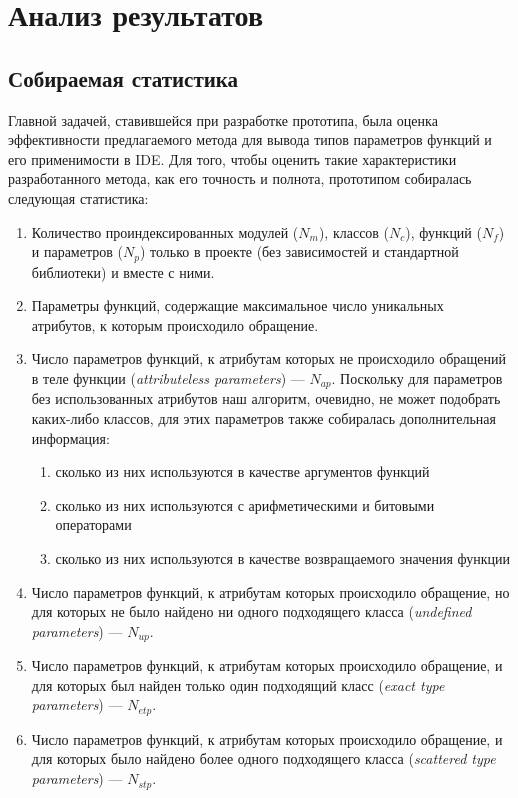 \chapter{Анализ результатов}

\section{Собираемая статистика}
\label{sec:statistics-collecting}

Главной задачей, ставившейся при разработке прототипа, была оценка эффективности
предлагаемого метода для вывода типов параметров функций и его применимости в
IDE. Для того, чтобы оценить такие характеристики разработанного метода, как его
точность и полнота, прототипом собиралась следующая статистика:

\begin{enumerate}
  \item Количество проиндексированных модулей ($N_m$), классов ($N_c$), функций
    ($N_f$) и параметров ($N_p$) только в проекте (без зависимостей и
    стандартной библиотеки) и вместе с ними.

  \item Параметры функций, содержащие максимальное число уникальных атрибутов, к
    которым происходило обращение.

  \item Число параметров функций, к атрибутам которых не происходило обращений в
    теле функции (\emph{attributeless parameters}) --- $N_{ap}$.
    Поскольку для параметров без использованных атрибутов наш алгоритм,
    очевидно, не может подобрать каких-либо классов, для этих параметров также
    собиралась дополнительная информация:
    
    \begin{enumerate}
        \item сколько из них используются в качестве аргументов функций
        \item сколько из них используются с арифметическими и битовыми операторами
        \item сколько из них используются в качестве возвращаемого значения функции
    \end{enumerate}

  \item Число параметров функций, к атрибутам которых происходило обращение, но для
    которых не было найдено ни одного подходящего класса (\emph{undefined
      parameters}) --- $N_{up}$.

  \item Число параметров функций, к атрибутам которых происходило обращение, и для
    которых был найден только один подходящий класс (\emph{exact type parameters}) 
    --- $N_{etp}$.

  \item Число параметров функций, к атрибутам которых происходило обращение, и для
    которых было найдено более одного подходящего класса (\emph{scattered type
      parameters}) --- $N_{stp}$.

\end{enumerate}

